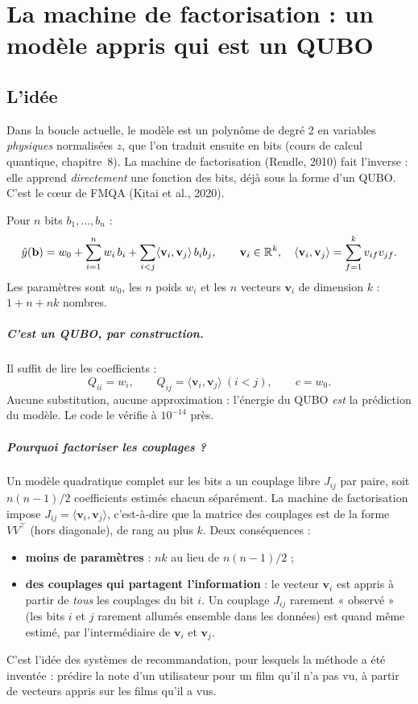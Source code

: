 \chapter{La machine de factorisation : un modèle appris qui est un QUBO}\label{ch:fm}

\section{L'idée}
Dans la boucle actuelle, le modèle est un polynôme de degré 2 en variables \emph{physiques} normalisées $z$, que l'on traduit ensuite en bits (cours de calcul quantique, chapitre~8). La machine de factorisation (Rendle, 2010) fait l'inverse : elle apprend \emph{directement} une fonction des bits, déjà sous la forme d'un QUBO. C'est le cœur de FMQA (Kitai et al., 2020).

\begin{definition}
Pour $n$ bits $b_1,\dots,b_n$ :
\[ \hat y(\mathbf b)=w_0+\sum_{i=1}^nw_i\,b_i+\sum_{i<j}\langle\mathbf v_i,\mathbf v_j\rangle\,b_ib_j,\qquad \mathbf v_i\in\mathbb{R}^k,\quad\langle\mathbf v_i,\mathbf v_j\rangle=\sum_{f=1}^kv_{if}v_{jf}. \]
Les paramètres sont $w_0$, les $n$ poids $w_i$ et les $n$ vecteurs $\mathbf v_i$ de dimension $k$ : $1+n+nk$ nombres.
\end{definition}

\paragraph{C'est un QUBO, par construction.} Il suffit de lire les coefficients :
\[ Q_{ii}=w_i,\qquad Q_{ij}=\langle\mathbf v_i,\mathbf v_j\rangle\ (i<j),\qquad c=w_0. \]
Aucune substitution, aucune approximation : l'énergie du QUBO \emph{est} la prédiction du modèle. Le code le vérifie à $10^{-14}$ près.

\paragraph{Pourquoi factoriser les couplages ?} Un modèle quadratique complet sur les bits a un couplage libre $J_{ij}$ par paire, soit $n(n-1)/2$ coefficients estimés chacun séparément. La machine de factorisation impose $J_{ij}=\langle\mathbf v_i,\mathbf v_j\rangle$, c'est-à-dire que la matrice des couplages est de la forme $VV^\top$ (hors diagonale), de rang au plus $k$. Deux conséquences :
\begin{itemize}
\item \textbf{moins de paramètres} : $nk$ au lieu de $n(n-1)/2$ ;
\item \textbf{des couplages qui partagent l'information} : le vecteur $\mathbf v_i$ est appris à partir de \emph{tous} les couplages du bit $i$. Un couplage $J_{ij}$ rarement « observé » (les bits $i$ et $j$ rarement allumés ensemble dans les données) est quand même estimé, par l'intermédiaire de $\mathbf v_i$ et $\mathbf v_j$.
\end{itemize}
C'est l'idée des systèmes de recommandation, pour lesquels la méthode a été inventée : prédire la note d'un utilisateur pour un film qu'il n'a pas vu, à partir de vecteurs appris sur les films qu'il a vus.

